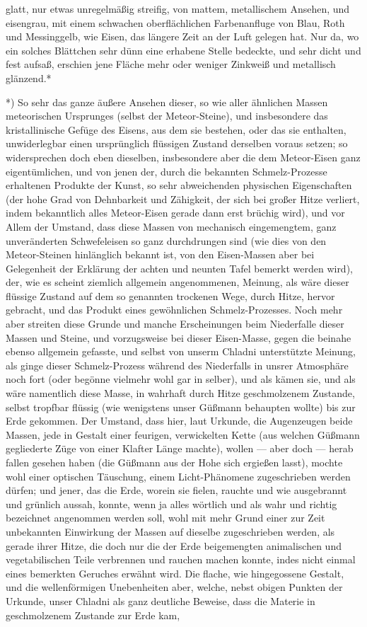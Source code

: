 \documentclass[a4paper, 11pt, oneside, german]{article}
\begin{document}
glatt, nur etwas unregelmäßig streifig, von mattem, metallischem Ansehen, und eisengrau, mit einem schwachen oberflächlichen Farbenanfluge von Blau, Roth und Messinggelb, wie Eisen, das längere Zeit an der Luft gelegen hat. Nur da, wo ein solches Blättchen sehr dünn eine erhabene Stelle bedeckte, und sehr dicht und fest aufsaß, erschien jene Fläche mehr oder weniger Zinkweiß und metallisch glänzend.*

*) So sehr das ganze äußere Ansehen dieser, so wie aller ähnlichen Massen meteorischen Ursprunges (selbst der Meteor-Steine), und insbesondere das kristallinische Gefüge des Eisens, aus dem sie bestehen, oder das sie enthalten, unwiderlegbar einen ursprünglich flüssigen Zustand derselben voraus setzen; so widersprechen doch eben dieselben, insbesondere aber die dem Meteor-Eisen ganz eigentümlichen, und von jenen der, durch die bekannten Schmelz-Prozesse erhaltenen Produkte der Kunst, so sehr abweichenden physischen Eigenschaften (der hohe Grad von Dehnbarkeit und Zähigkeit, der sich bei großer Hitze verliert, indem bekanntlich alles Meteor-Eisen gerade dann erst brüchig wird), und vor Allem der Umstand, dass diese Massen von mechanisch eingemengtem, ganz unveränderten Schwefeleisen so ganz durchdrungen sind (wie dies von den Meteor-Steinen hinlänglich bekannt ist, von den Eisen-Massen aber bei Gelegenheit der Erklärung der achten und neunten Tafel bemerkt werden wird), der, wie es scheint ziemlich allgemein angenommenen, Meinung, als wäre dieser flüssige Zustand auf dem so genannten trockenen Wege, durch Hitze, hervor gebracht, und das Produkt eines gewöhnlichen Schmelz-Prozesses. Noch mehr aber streiten diese Grunde und manche Erscheinungen beim Niederfalle dieser Massen und Steine, und vorzugsweise bei dieser Eisen-Masse, gegen die beinahe ebenso allgemein gefasste, und selbst von unserm Chladni unterstützte Meinung, als ginge dieser Schmelz-Prozess während des Niederfalls in unsrer Atmosphäre noch fort (oder begönne vielmehr wohl gar in selber), und als kämen sie, und als wäre namentlich diese Masse, in wahrhaft durch Hitze geschmolzenem Zustande, selbst tropfbar flüssig (wie wenigstens unser Güßmann behaupten wollte) bis zur Erde gekommen. Der Umstand, dass hier, laut Urkunde, die Augenzeugen beide Massen, jede in Gestalt einer feurigen, verwickelten Kette (aus welchen Güßmann gegliederte Züge von einer Klafter Länge machte), wollen --- aber doch --- herab fallen gesehen haben (die Güßmann aus der Hohe sich ergießen lasst), mochte wohl einer optischen Täuschung, einem Licht-Phänomene zugeschrieben werden dürfen; und jener, das die Erde, worein sie fielen, rauchte und wie ausgebrannt und grünlich aussah, konnte, wenn ja alles wörtlich und als wahr und richtig bezeichnet angenommen werden soll, wohl mit mehr Grund einer zur Zeit unbekannten Einwirkung der Massen auf dieselbe zugeschrieben werden, als gerade ihrer Hitze, die doch nur die der Erde beigemengten animalischen und vegetabilischen Teile verbrennen und rauchen machen konnte, indes nicht einmal eines bemerkten Geruches erwähnt wird. Die flache, wie hingegossene Gestalt, und die wellenförmigen Unebenheiten aber, welche, nebst obigen Punkten der Urkunde, unser Chladni als ganz deutliche Beweise, dass die Materie in geschmolzenem Zustande zur Erde kam, 
\end{document}
